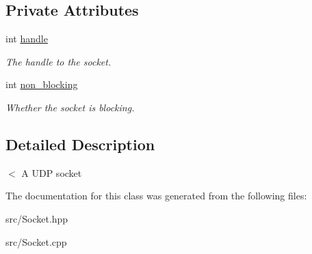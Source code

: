 \subsection*{Private Attributes}
\begin{DoxyCompactItemize}
\item 
\mbox{\label{classSocket_a1d1e25e0a7eddecb3473350a1a8c3178}} 
int \hyperlink{classSocket_a1d1e25e0a7eddecb3473350a1a8c3178}{handle}
\begin{DoxyCompactList}\small\item\em The handle to the socket. \end{DoxyCompactList}\item 
\mbox{\label{classSocket_ad962ba2bb1875300c69ff5b4e6a70cd1}} 
int \hyperlink{classSocket_ad962ba2bb1875300c69ff5b4e6a70cd1}{non\+\_\+blocking}
\begin{DoxyCompactList}\small\item\em Whether the socket is blocking. \end{DoxyCompactList}\end{DoxyCompactItemize}


\subsection{Detailed Description}
$<$ A U\+DP socket 

The documentation for this class was generated from the following files\+:\begin{DoxyCompactItemize}
\item 
src/Socket.\+hpp\item 
src/Socket.\+cpp\end{DoxyCompactItemize}
